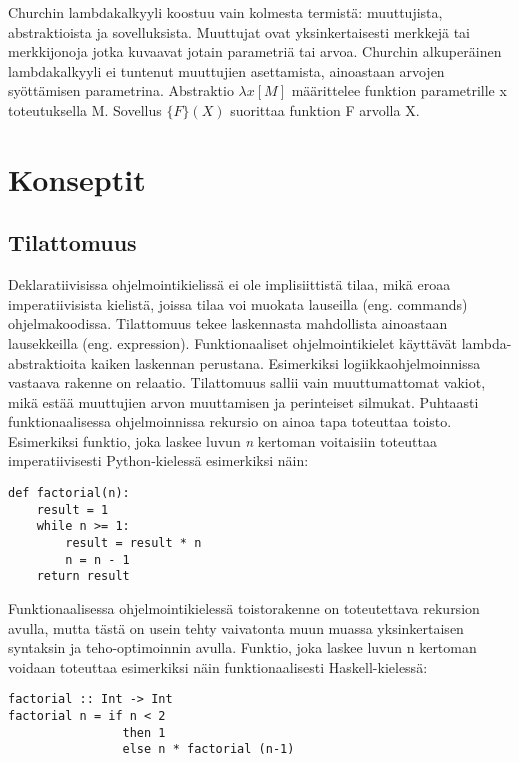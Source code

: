 Churchin lambdakalkyyli koostuu vain kolmesta termistä: muuttujista, abstraktioista ja sovelluksista.
Muuttujat ovat yksinkertaisesti merkkejä tai merkkijonoja jotka kuvaavat jotain parametriä tai arvoa. Churchin
alkuperäinen lambdakalkyyli ei tuntenut muuttujien asettamista, ainoastaan arvojen syöttämisen parametrina. Abstraktio
$ \lambda x [ M ] $ määrittelee funktion parametrille x toteutuksella M. Sovellus $ \{ F \} ( X ) $ suorittaa funktion F
arvolla X. \cite{lambdacalculus}


\section{Konseptit}

\subsection{Tilattomuus}
Deklaratiivisissa ohjelmointikielissä ei ole implisiittistä tilaa, mikä eroaa imperatiivisista kielistä, joissa tilaa
voi muokata lauseilla (eng. commands) ohjelmakoodissa. Tilattomuus tekee laskennasta mahdollista ainoastaan lausekkeilla
(eng. expression). Funktionaaliset ohjelmointikielet käyttävät lambda-abstraktioita kaiken laskennan perustana.
Esimerkiksi logiikkaohjelmoinnissa vastaava rakenne on relaatio. Tilattomuus sallii vain muuttumattomat vakiot, mikä
estää muuttujien arvon muuttamisen ja perinteiset silmukat. Puhtaasti funktionaalisessa ohjelmoinnissa rekursio on ainoa
tapa toteuttaa toisto. Esimerkiksi funktio, joka laskee luvun \textit{n} kertoman voitaisiin toteuttaa imperatiivisesti
Python-kielessä esimerkiksi näin:
\begin{verbatim}
def factorial(n):
    result = 1
    while n >= 1:
        result = result * n
        n = n - 1
    return result
\end{verbatim}
Funktionaalisessa ohjelmointikielessä toistorakenne on toteutettava rekursion avulla, mutta tästä on usein tehty
vaivatonta muun muassa yksinkertaisen syntaksin ja teho-optimoinnin avulla. \cite{hudak} Funktio, joka laskee luvun n
kertoman voidaan toteuttaa esimerkiksi näin funktionaalisesti Haskell-kielessä:
\begin{verbatim}
factorial :: Int -> Int
factorial n = if n < 2
                then 1
                else n * factorial (n-1)
\end{verbatim}

